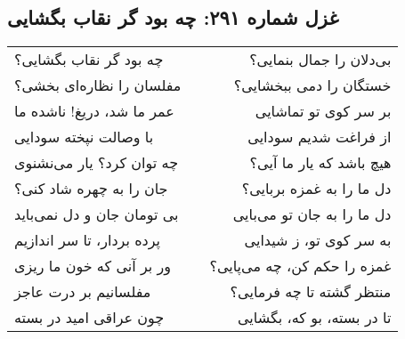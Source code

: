 \begin{center}
\section*{غزل شماره ۲۹۱: چه بود گر نقاب بگشایی}
\label{sec:291}
\begin{longtable}{l p{0.5cm} r}
چه بود گر نقاب بگشایی؟
&&
بی‌دلان را جمال بنمایی؟
\\
مفلسان را نظاره‌ای بخشی؟
&&
خستگان را دمی ببخشایی؟
\\
عمر ما شد، دریغ! ناشده ما
&&
بر سر کوی تو تماشایی
\\
با وصالت نپخته سودایی
&&
از فراغت شدیم سودایی
\\
چه توان کرد؟ یار می‌نشنوی
&&
هیچ باشد که یار ما آیی؟
\\
جان را به چهره شاد کنی؟
&&
دل ما را به غمزه بربایی؟
\\
بی تومان جان و دل نمی‌باید
&&
دل ما را به جان تو می‌بایی
\\
پرده بردار، تا سر اندازیم
&&
به سر کوی تو، ز شیدایی
\\
ور بر آنی که خون ما ریزی
&&
غمزه را حکم کن، چه می‌پایی؟
\\
مفلسانیم بر درت عاجز
&&
منتظر گشته تا چه فرمایی؟
\\
چون عراقی امید در بسته
&&
تا در بسته، بو که، بگشایی
\\
\end{longtable}
\end{center}
